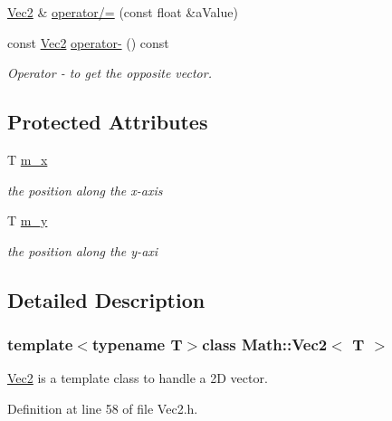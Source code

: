 \begin{DoxyCompactItemize}
\hyperlink{class_math_1_1_vec2}{Vec2} \& \hyperlink{class_math_1_1_vec2_a38a63f1fc919b86e31b71b1abf2f13da}{operator/=} (const float \&aValue)
\item 
const \hyperlink{class_math_1_1_vec2}{Vec2} \hyperlink{class_math_1_1_vec2_a8a23d813b8a85704647f1a2ff63ca362}{operator-\/} () const 
\begin{DoxyCompactList}\small\item\em Operator -\/ to get the opposite vector. \end{DoxyCompactList}\end{DoxyCompactItemize}
\subsection*{Protected Attributes}
\begin{DoxyCompactItemize}
\item 
T \hyperlink{class_math_1_1_vec2_ae7e5f6fb13e2a5ef8e0e7aa5a373f18c}{m\_\-x}
\begin{DoxyCompactList}\small\item\em the position along the x-\/axis \end{DoxyCompactList}\item 
T \hyperlink{class_math_1_1_vec2_abd88545de9b57b06d6ebbdffa4824913}{m\_\-y}
\begin{DoxyCompactList}\small\item\em the position along the y-\/axi \end{DoxyCompactList}\end{DoxyCompactItemize}


\subsection{Detailed Description}
\subsubsection*{template$<$typename T$>$class Math::Vec2$<$ T $>$}

\hyperlink{class_math_1_1_vec2}{Vec2} is a template class to handle a 2D vector. 

Definition at line 58 of file Vec2.h.



